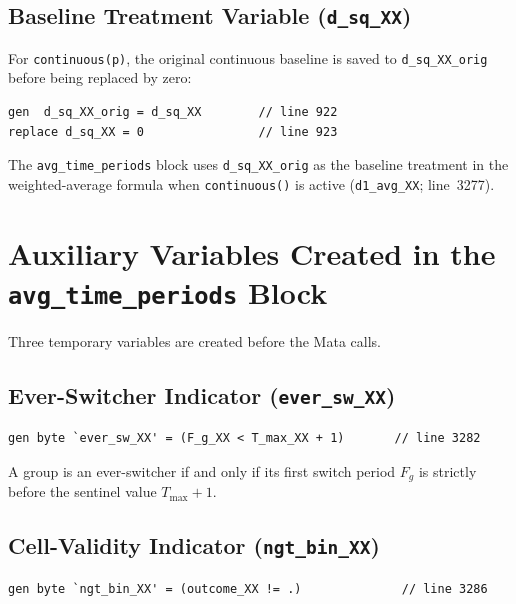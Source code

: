 \documentclass[11pt]{article}
\begin{document}
\subsection{Baseline Treatment Variable (\texttt{d\_sq\_XX})}

For \texttt{continuous(p)}, the original continuous baseline is saved to
\texttt{d\_sq\_XX\_orig} before being replaced by zero:

\begin{lstlisting}[language={}]
gen  d_sq_XX_orig = d_sq_XX        // line 922
replace d_sq_XX = 0                // line 923
\end{lstlisting}

The \texttt{avg\_time\_periods} block uses \texttt{d\_sq\_XX\_orig} as the
baseline treatment in the weighted-average formula when \texttt{continuous()} is
active (\texttt{d1\_avg\_XX}; line~3277).

\section{Auxiliary Variables Created in the \texttt{avg\_time\_periods} Block}

Three temporary variables are created before the Mata calls.

\subsection{Ever-Switcher Indicator (\texttt{ever\_sw\_XX})}

\begin{lstlisting}[language={}]
gen byte `ever_sw_XX' = (F_g_XX < T_max_XX + 1)       // line 3282
\end{lstlisting}

A group is an ever-switcher if and only if its first switch period $F_g$ is
strictly before the sentinel value $T_{\max}+1$.

\subsection{Cell-Validity Indicator (\texttt{ngt\_bin\_XX})}
\label{sec:ngtbin}

\begin{lstlisting}[language={}]
gen byte `ngt_bin_XX' = (outcome_XX != .)              // line 3286
\end{lstlisting}
\end{document}
